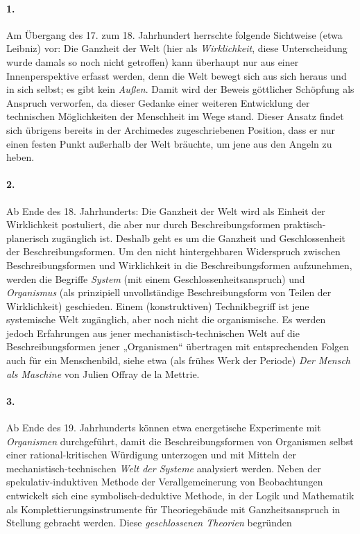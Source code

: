 \documentclass[11pt,a4paper]{article}
\begin{document}
\paragraph{1.}
Am Übergang des 17. zum 18. Jahrhundert herrschte folgende Sichtweise (etwa
Leibniz) vor: Die Ganzheit der Welt (hier als \emph{Wirklichkeit}, diese
Unterscheidung wurde damals so noch nicht getroffen) kann überhaupt nur aus
einer Innenperspektive erfasst werden, denn die Welt bewegt sich aus sich
heraus und in sich selbst; es gibt kein \emph{Außen}. Damit wird der Beweis
göttlicher Schöpfung als Anspruch verworfen, da dieser Gedanke einer weiteren
Entwicklung der technischen Möglichkeiten der Menschheit im Wege stand.
Dieser Ansatz findet sich übrigens bereits in der Archimedes zugeschriebenen
Position, dass er nur einen festen Punkt außerhalb der Welt bräuchte, um jene
aus den Angeln zu heben.

\paragraph{2.}
Ab Ende des 18. Jahrhunderts: Die Ganzheit der Welt wird als Einheit der
Wirklichkeit postuliert, die aber nur durch Beschreibungsformen
praktisch-planerisch zugänglich ist. Deshalb geht es um die Ganzheit und
Geschlossenheit der Beschreibungsformen. Um den nicht hintergehbaren
Widerspruch zwischen Beschreibungsformen und Wirklichkeit in die
Beschreibungsformen aufzunehmen, werden die Begriffe \emph{System} (mit einem
Geschlossenheitsanspruch) und \emph{Organismus} (als prinzipiell
unvollständige Beschreibungsform von Teilen der Wirklichkeit) geschieden.
Einem (konstruktiven) Technikbegriff ist jene systemische Welt zugänglich,
aber noch nicht die organismische. Es werden jedoch Erfahrungen aus jener
mechanistisch-technischen Welt auf die Beschreibungsformen jener „Organismen“
übertragen mit entsprechenden Folgen auch für ein Menschenbild, siehe etwa
(als frühes Werk der Periode) \emph{Der Mensch als Maschine} von Julien Offray
de la Mettrie.

\paragraph{3.}
Ab Ende des 19. Jahrhunderts können etwa energetische Experimente mit
\emph{Organismen} durchgeführt, damit die Beschreibungsformen von Organismen
selbst einer rational-kritischen Würdigung unterzogen und mit Mitteln der
mechanistisch-technischen \emph{Welt der Systeme} analysiert werden. Neben der
spekulativ-induktiven Methode der Verallgemeinerung von Beobachtungen
entwickelt sich eine symbolisch-deduktive Methode, in der Logik und Mathematik
als Komplettierungsinstrumente für Theoriegebäude mit Ganzheitsanspruch in
Stellung gebracht werden. Diese \emph{geschlossenen Theorien} begründen
\end{document}
